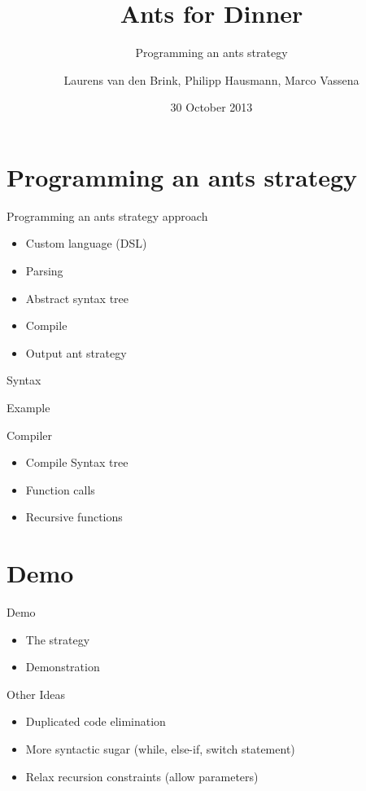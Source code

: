 \documentclass{beamer}
\title{Ants for Dinner}
\subtitle{Programming an ants strategy}
\author{Laurens van den Brink, Philipp Hausmann, Marco Vassena}
\date{30 October 2013}
\begin{document}
\begin{frame}
  \titlepage
\end{frame}


\section{Programming an ants strategy}
\begin{frame}{Programming an ants strategy approach}
	\begin{itemize}
		\item Custom language (DSL)
		\item Parsing
		\item Abstract syntax tree
		\item Compile
		\item Output ant strategy
	\end{itemize}
\end{frame}

\begin{frame}[fragile]{Syntax}
	\begin{block}{Example}
	\end{block}
\end{frame}

\begin{frame}{Compiler}
	\begin{itemize}
		\item Compile Syntax tree
		\item Function calls
		\item Recursive functions
	\end{itemize}
\end{frame}

\section{Demo}

\begin{frame}{Demo}
	\begin{itemize}
		\item The strategy
		\item Demonstration
	\end{itemize}
\end{frame}

\begin{frame}{Other Ideas}
    \begin{itemize}
        \item Duplicated code elimination
        \item More syntactic sugar (while, else-if, switch statement)
        \item Relax recursion constraints (allow parameters)
    \end{itemize}
\end{frame}
\end{document}
